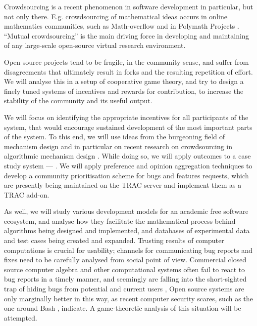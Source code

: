 \begin{workpackage}[id=social-aspects,wphases=1-48!.5,
  title=Social Aspects,
  lead=UO,
  UORM=1,USHRM=8, USORM=5]
\begin{wpdescription}
Crowdsourcing is a recent phenomenon in software development in
particular, but not only there. E.g.  crowdsourcing of mathematical
ideas occurs in online mathematics communities, such as Math-overflow
\cite{mathoverflow} and in Polymath Projects \cite{polymath}.
``Mutual crowdsourcing'' is the main driving force in developing and
maintaining of any large-scale open-source virtual research
environment.

Open source projects tend to be fragile, in the community sense, and
suffer from disagreements that ultimately result in forks and the
resulting repetition of effort. We will analyse this in a setup of
cooperative game theory, and try to design a finely tuned systems of
incentives and rewards for contribution, to increase the stability of
the community and its useful output.

We will focus on identifying the appropriate incentives for all
participants of the system, that would encourage sustained development
of the most important parts of the system.  To this end, we will use
ideas from the burgeoning field of mechanism design \cite{AGTbook} and
in particular on recent research on crowdsourcing in algorithmic
mechanism design \cite{crowds}.  While doing so, we will apply
outcomes to a case study system --- \Sage.  We will apply preference
and opinion aggregation techniques \cite{pref-aggr} to develop a
community prioritisation scheme for \Sage bugs and features requests,
which are presently being maintained on the \Sage TRAC server
\cite{trac-sagemath} and implement them as a TRAC \cite{Trac} add-on.

As well, we will study various development models for an academic free
software ecosystem, and analyse how they facilitate the mathematical
process behind algorithms being designed and implemented, and
databases of experimental data and test cases being created and
expanded.  Trusting results of computer computations is crucial for
usability; channels for communicating bug reports and fixes need to be
carefully analysed from social point of view.  Commercial closed
source computer algebra and other computational systems often fail to
react to bug reports in a timely manner, and seemingly are falling
into the short-sighted trap of hiding bugs from potential and current
users \cite{misfort}, Open source systems are only marginally better
in this way, as recent computer security scares, such as the one
around Bash \cite{shellshock}, indicate.  A game-theoretic analysis of
this situation will be attempted.
\end{wpdescription}


\end{workpackage}
